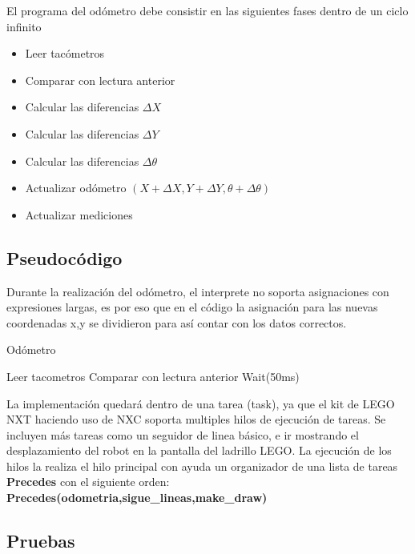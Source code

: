 \documentclass[oneside,twocolumn]{article}
\begin{document}
El programa del odómetro debe consistir en las siguientes fases dentro de un ciclo infinito

\begin{itemize}
\item Leer tacómetros
\item Comparar con lectura anterior
\item Calcular las diferencias $\Delta X$
\item Calcular las diferencias $\Delta Y$
\item Calcular las diferencias $\Delta \theta$
\item Actualizar odómetro $(X+\Delta X, Y+\Delta Y, \theta + \Delta \theta)$
\item Actualizar mediciones
\end{itemize}

\subsection{Pseudocódigo}

Durante la realización del odómetro, el interprete no soporta asignaciones con expresiones largas, es por eso que en el código la asignación para las nuevas coordenadas x,y se dividieron para así contar con los datos correctos.

\begin{algorithm}
  \caption{Odómetro}\label{alg:two}
  Leer tacometros\;
  Comparar con lectura anterior\;
  Wait(50ms)\;
\end{algorithm}

La implementación quedará dentro de una tarea (task), ya que el kit de LEGO NXT haciendo uso de NXC soporta multiples hilos de ejecución de tareas. Se incluyen más tareas como un seguidor de linea básico, e ir mostrando el desplazamiento del robot en la pantalla del ladrillo LEGO. La ejecución de los hilos la realiza el hilo principal con ayuda un organizador de una lista de tareas \textbf{Precedes} con el siguiente orden: \\
\textbf{Precedes(odometria,sigue\_lineas,make\_draw)\;} 

\subsection{Pruebas}
\end{document}

